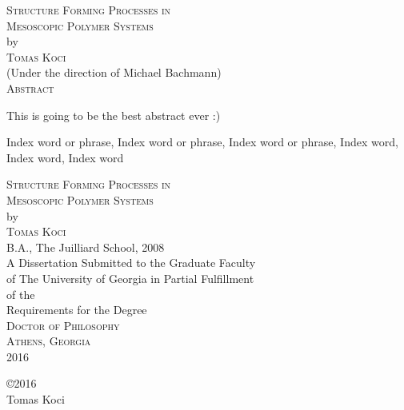 \documentclass[12pt]{report}
\begin{document}
\newpage
\thispagestyle{empty}
\vspace*{18pt}
\begin{center}
\textsc{Structure Forming Processes in\\Mesoscopic Polymer Systems}\\[18pt]
by\\[18pt]
\textsc{Tomas Koci}\\[12pt]
(Under the direction of Michael Bachmann)\\[12pt]
\textsc{Abstract}
\end{center}
This is going to be the best abstract ever :)

\begin{list}{\sc Index words:\hfill}{\leftmargin 1.4in}
\item 
\begin{flushleft}\singlespacing
Index word or phrase,
Index word or phrase,
Index word or phrase,
Index word, 
Index word,
Index word
\end{flushleft}
\end{list}



\newpage
\thispagestyle{empty}
\vspace*{18pt}
\begin{center}
\textsc{Structure Forming Processes in\\Mesoscopic Polymer Systems}\\[18pt]
by\\[18pt]
\textsc{Tomas Koci}\\[12pt]
B.A., The Juilliard School, 2008\\
\vfill
A Dissertation Submitted to the Graduate Faculty \\
of The University of Georgia in Partial Fulfillment \\
of the \\
Requirements for the Degree \\[10pt]
\textsc{Doctor of Philosophy}\\[36pt]
\textsc{Athens, Georgia}\\[18pt]
2016
\end{center}

\newpage
\thispagestyle{empty}
\vspace*{5.5in}
\begin{center}
\copyright 2016 \\
Tomas Koci
\end{center}
\end{document}
